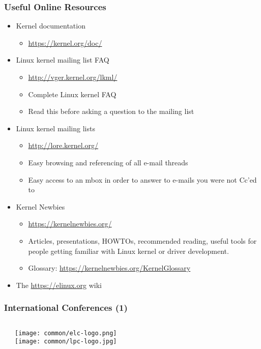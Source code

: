 \begin{frame}
  \frametitle{Useful Online Resources}
  \begin{itemize}
  \item Kernel documentation
    \begin{itemize}
    \item \url{https://kernel.org/doc/}
    \end{itemize}
  \item Linux kernel mailing list FAQ
    \begin{itemize}
    \item \url{http://vger.kernel.org/lkml/}
    \item Complete Linux kernel FAQ
    \item Read this before asking a question to the mailing list
    \end{itemize}
  \item Linux kernel mailing lists
    \begin{itemize}
    \item \url{http://lore.kernel.org/}
    \item Easy browsing and referencing of all e-mail threads
    \item Easy access to an mbox in order to answer to e-mails you were
      not Cc'ed to
    \end{itemize}
  \item Kernel Newbies
    \begin{itemize}
    \item \url{https://kernelnewbies.org/}
    \item Articles, presentations, HOWTOs, recommended reading, useful
      tools for people getting familiar with Linux kernel or driver
      development.
    \item Glossary: \url{https://kernelnewbies.org/KernelGlossary}
    \end{itemize}
  \item The \url{https://elinux.org} wiki
\end{itemize}
\end{frame}

\begin{frame}
  \frametitle{International Conferences (1)}
  \begin{columns}
  \begin{itemize}
    
    
  \end{itemize}
     \texttt{[image: common/elc-logo.png]}\\
     \vspace{1cm}
     \texttt{[image: common/lpc-logo.jpg]}\\
  \end{columns}
\end{frame}

